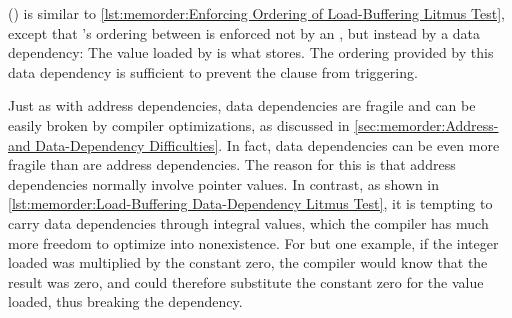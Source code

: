 \begin{fcvref}
()
is similar to
\cref{lst:memorder:Enforcing Ordering of Load-Buffering Litmus Test},
except that 's ordering between  is
enforced not by an , but instead by a data dependency:
The value loaded by  is what  stores.
The ordering provided by this data dependency is sufficient to prevent
the  clause from triggering.
\end{fcvref}

Just as with address dependencies, data dependencies are
fragile and can be easily broken by compiler optimizations, as discussed in
\cref{sec:memorder:Address- and Data-Dependency Difficulties}.
In fact, data dependencies can be even more fragile than are address
dependencies.
The reason for this is that address dependencies normally involve
pointer values.
In contrast, as shown in
\cref{lst:memorder:Load-Buffering Data-Dependency Litmus Test},
it is tempting to carry data dependencies through integral values,
which the compiler has much more freedom to optimize into nonexistence.
For but one example, if the integer loaded was multiplied by the constant
zero, the compiler would know that the result was zero, and could therefore
substitute the constant zero for the value loaded, thus breaking
the dependency.

\QuickQuizEnd

